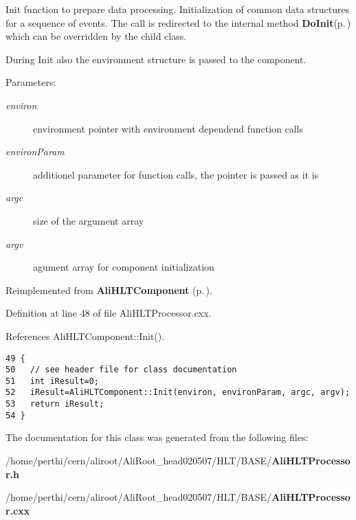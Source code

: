 Init function to prepare data processing. Initialization of common data structures for a sequence of events. The call is redirected to the internal method {\bf Do\-Init}{\rm (p.\,\pageref{classAliHLTComponent_b5})} which can be overridden by the child class.\par
 During Init also the environment structure is passed to the component. \begin{Desc}
\item[Parameters:]
\begin{description}
\item[{\em environ}]environment pointer with environment dependend function calls \item[{\em environ\-Param}]additionel parameter for function calls, the pointer is passed as it is \item[{\em argc}]size of the argument array \item[{\em argv}]agument array for component initialization \end{description}
\end{Desc}


Reimplemented from {\bf Ali\-HLTComponent} {\rm (p.\,\pageref{classAliHLTComponent_a4})}.

Definition at line 48 of file Ali\-HLTProcessor.cxx.

References Ali\-HLTComponent::Init().

\footnotesize\begin{verbatim}49 {
50   // see header file for class documentation
51   int iResult=0;
52   iResult=AliHLTComponent::Init(environ, environParam, argc, argv);
53   return iResult;
54 }
\end{verbatim}\normalsize 




The documentation for this class was generated from the following files:\begin{CompactItemize}
\item 
/home/perthi/cern/aliroot/Ali\-Root\_\-head020507/HLT/BASE/{\bf Ali\-HLTProcessor.h}\item 
/home/perthi/cern/aliroot/Ali\-Root\_\-head020507/HLT/BASE/{\bf Ali\-HLTProcessor.cxx}\end{CompactItemize}
